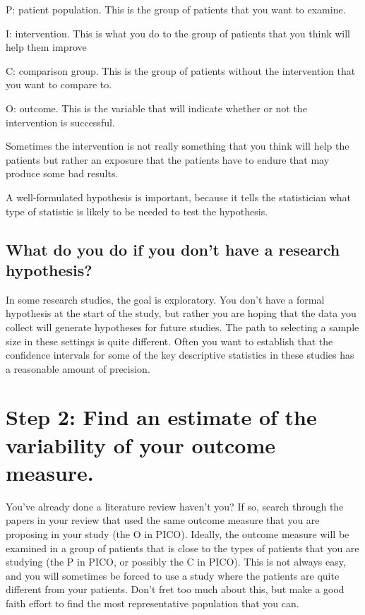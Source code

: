 \documentclass[
  letterpaper,
  DIV=11,
  numbers=noendperiod]{scrreprt}
\begin{document}
P: patient population. This is the group of patients that you want to
examine.

I: intervention. This is what you do to the group of patients that you
think will help them improve

C: comparison group. This is the group of patients without the
intervention that you want to compare to.

O: outcome. This is the variable that will indicate whether or not the
intervention is successful.

Sometimes the intervention is not really something that you think will
help the patients but rather an exposure that the patients have to
endure that may produce some bad results.

A well-formulated hypothesis is important, because it tells the
statistician what type of statistic is likely to be needed to test the
hypothesis.

\subsection{What do you do if you don't have a research
hypothesis?}\label{what-do-you-do-if-you-dont-have-a-research-hypothesis}

In some research studies, the goal is exploratory. You don't have a
formal hypothesis at the start of the study, but rather you are hoping
that the data you collect will generate hypotheses for future studies.
The path to selecting a sample size in these settings is quite
different. Often you want to establish that the confidence intervals for
some of the key descriptive statistics in these studies has a reasonable
amount of precision.

\section{Step 2: Find an estimate of the variability of your outcome
measure.}\label{step-2-find-an-estimate-of-the-variability-of-your-outcome-measure.}

You've already done a literature review haven't you? If so, search
through the papers in your review that used the same outcome measure
that you are proposing in your study (the O in PICO). Ideally, the
outcome measure will be examined in a group of patients that is close to
the types of patients that you are studying (the P in PICO, or possibly
the C in PICO). This is not always easy, and you will sometimes be
forced to use a study where the patients are quite different from your
patients. Don't fret too much about this, but make a good faith effort
to find the most representative population that you can.
\end{document}
